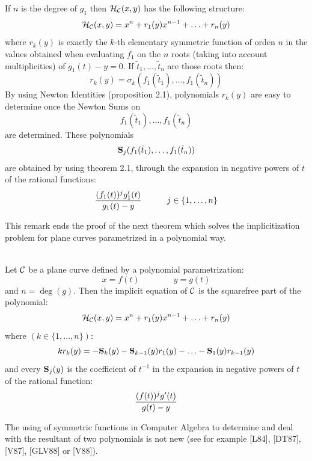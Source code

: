 If $n$ is the degree of $g_1$ then ${\cal H}_{\cal C}(x,y)$ has the
following structure:
\[{\cal H}_{\cal C}(x,y)=x^n+r_1(y)x^{n-1}+\ldots+r_n(y)\] where
$r_k(y)$ is exactly the $k$-th elementary symmetric function of orden
$n$ in the values obtained when evaluating $f_1$ on the $n$ roots
(taking into account multiplicities) of
$g_1(t)-y=0$. If
$\tilde{t}_1,\ldots,\tilde{t}_n$ are those roots then:
\[r_k(y)=\sigma_k(f_1(\tilde{t}_1),\ldots,f_1(\tilde{t}_n))\]  By
using Newton Identities (proposition 2.1), polynomials $r_k(y)$ are
easy to determine once the Newton Sums on
\[f_1(\tilde{t}_1),\ldots,f_1(\tilde{t}_n)\]  are determined. These
polynomials \[{\bf S}_j(f_1(\tilde{t}_1),\ldots,f_1(\tilde{t}_n))\]
are obtained by using theorem 2.1, through the expansion in negative
powers of $t$ of the rational functions:
\[{{(f_1(t))^jg_1'(t)}\over{g_1(t)-y}}\qquad\quad 
j\in\{1,\ldots,n\}\]

This remark ends the proof of the  next theorem which solves the
implicitization problem for plane curves parametrized in a polynomial
way.

\begin{teorema}\hskip 0pt\\ Let ${\cal C}$ be a plane curve defined
by a polynomial parametrization:
\[x=f(t)\qquad\qquad y=g(t)\] and $n=\deg(g)$. Then the implicit
equation of
${\cal C}$ is the squarefree part of the polynomial:
\[{\cal H}_{\cal C}(x,y)=x^n+r_1(y)x^{n-1}+\ldots+r_n(y)\] where 
$(k\in\{1,\ldots,n\})$:
\[kr_k(y)=
-{\bf S}_k(y)-{\bf S}_{k-1}(y)r_1(y)-\ldots-{\bf
S}_1(y)r_{k-1}(y)\] and every ${\bf S}_j(y)$ is the coefficient
of $t^{-1}$ in the expansion in negative powers of $t$ of the
rational function:
\[{{(f(t))^jg'(t)}\over{g(t)-y}}\]
\end{teorema}

The using of symmetric functions in Computer Algebra to determine and deal
with the  resultant of two polynomials is not new (see for example [L84], 
[DT87], [V87], [GLV88] or [V88]).

